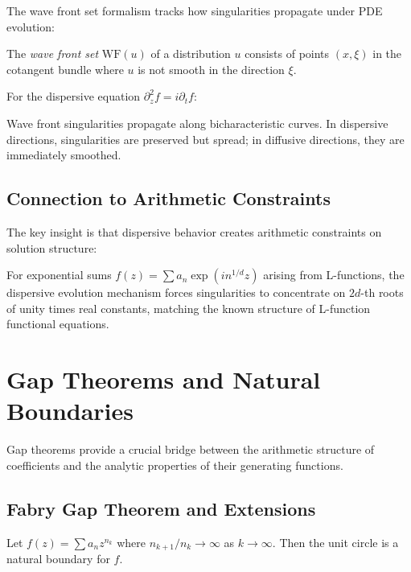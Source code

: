 The wave front set formalism tracks how singularities propagate under PDE evolution:

\begin{definition}
The \emph{wave front set} $\text{WF}(u)$ of a distribution $u$ consists of points $(x,\xi)$ in the cotangent bundle where $u$ is not smooth in the direction $\xi$.
\end{definition}

For the dispersive equation $\partial_z^2 f = i \partial_t f$:

\begin{theorem}
Wave front singularities propagate along bicharacteristic curves. In dispersive directions, singularities are preserved but spread; in diffusive directions, they are immediately smoothed.
\end{theorem}

\subsection{Connection to Arithmetic Constraints}

The key insight is that dispersive behavior creates arithmetic constraints on solution structure:

\begin{conjecture}
For exponential sums $f(z) = \sum a_n \exp(i n^{1/d} z)$ arising from L-functions, the dispersive evolution mechanism forces singularities to concentrate on $2d$-th roots of unity times real constants, matching the known structure of L-function functional equations.
\end{conjecture}

\section{Gap Theorems and Natural Boundaries}
\label{sec:gap_theorems}

Gap theorems provide a crucial bridge between the arithmetic structure of coefficients and the analytic properties of their generating functions.

\subsection{Fabry Gap Theorem and Extensions}

\begin{theorem}
Let $f(z) = \sum a_n z^{n_k}$ where $n_{k+1}/n_k \to \infty$ as $k \to \infty$. Then the unit circle is a natural boundary for $f$.
\end{theorem}

